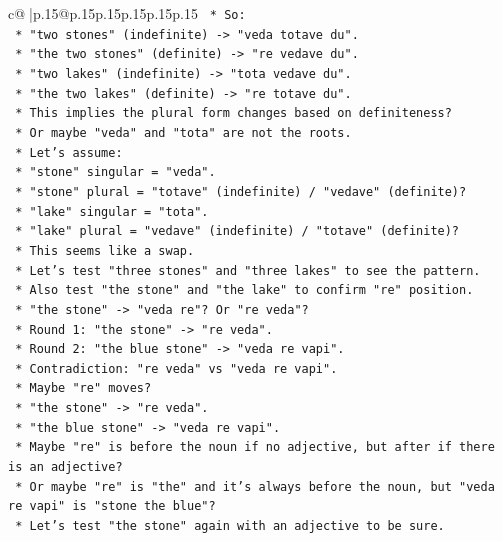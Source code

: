 \documentclass{article}
\begin{document}
{\begin{supertabular}{c@{$\;$}|p{.15\linewidth}@{}p{.15\linewidth}p{.15\linewidth}p{.15\linewidth}p{.15\linewidth}p{.15\linewidth}}
{{{\texttt{    *   So:} \\
\texttt{        *   "two stones" (indefinite) {-}> "veda totave du".} \\
\texttt{        *   "the two stones" (definite) {-}> "re vedave du".} \\
\texttt{        *   "two lakes" (indefinite) {-}> "tota vedave du".} \\
\texttt{        *   "the two lakes" (definite) {-}> "re totave du".} \\
\texttt{    *   This implies the plural form changes based on definiteness?} \\
\texttt{    *   Or maybe "veda" and "tota" are not the roots.} \\
\texttt{    *   Let's assume:} \\
\texttt{        *   "stone" singular = "veda".} \\
\texttt{        *   "stone" plural = "totave" (indefinite) / "vedave" (definite)?} \\
\texttt{        *   "lake" singular = "tota".} \\
\texttt{        *   "lake" plural = "vedave" (indefinite) / "totave" (definite)?} \\
\texttt{    *   This seems like a swap.} \\
\texttt{    *   Let's test "three stones" and "three lakes" to see the pattern.} \\
\texttt{    *   Also test "the stone" and "the lake" to confirm "re" position.} \\
\texttt{    *   "the stone" {-}> "veda re"? Or "re veda"?} \\
\texttt{    *   Round 1: "the stone" {-}> "re veda".} \\
\texttt{    *   Round 2: "the blue stone" {-}> "veda re vapi".} \\
\texttt{    *   Contradiction: "re veda" vs "veda re vapi".} \\
\texttt{    *   Maybe "re" moves?} \\
\texttt{    *   "the stone" {-}> "re veda".} \\
\texttt{    *   "the blue stone" {-}> "veda re vapi".} \\
\texttt{    *   Maybe "re" is before the noun if no adjective, but after if there is an adjective?} \\
\texttt{    *   Or maybe "re" is "the" and it's always before the noun, but "veda re vapi" is "stone the blue"?} \\
\texttt{    *   Let's test "the stone" again with an adjective to be sure.} \\
}}}
\end{supertabular}}
\end{document}
